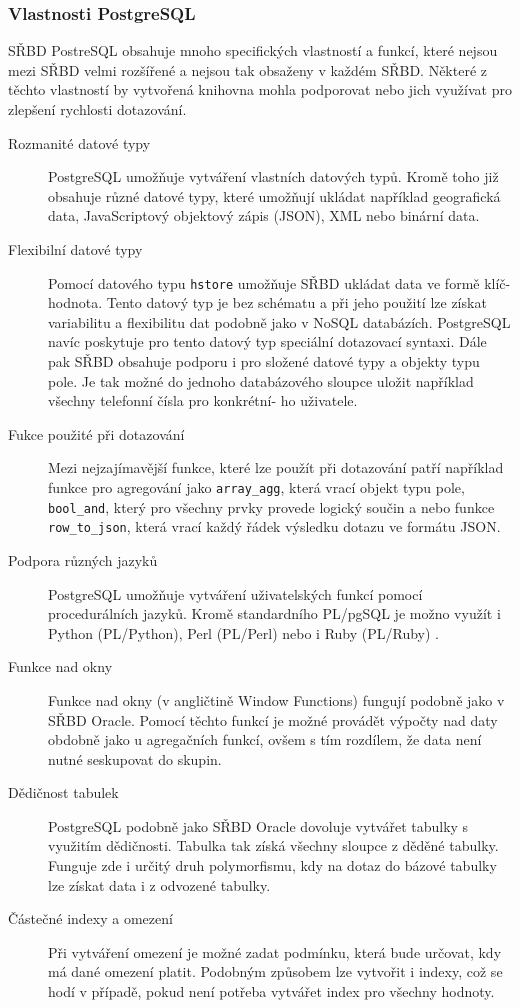 \documentclass[ing,male,java,dept456]{diploma}						%
\begin{document}
\subsubsection{Vlastnosti PostgreSQL}
\label{subsubsec:PostgreSQL}

SŘBD PostreSQL obsahuje mnoho specifických vlastností a funkcí, které nejsou mezi SŘBD velmi rozšířené a nejsou tak obsaženy v každém SŘBD. Některé z těchto vlastností by vytvořená knihovna mohla podporovat nebo jich využívat pro zlepšení rychlosti dotazování.

\begin{description}
  \item[Rozmanité datové typy] PostgreSQL umožňuje vytváření vlastních datových typů. Kromě toho již obsahuje různé datové typy, které umožňují ukládat například geografická data, JavaScriptový objektový zápis (JSON), XML nebo binární data. 
  \item[Flexibilní datové typy] Pomocí datového typu \lstinline[style=inlinepython]|hstore| umožňuje SŘBD ukládat data ve formě klíč-hodnota. Tento datový typ je bez schématu a při jeho použití lze získat variabilitu a flexibilitu dat podobně jako v NoSQL databázích. PostgreSQL navíc poskytuje pro tento datový typ speciální dotazovací syntaxi. Dále pak SŘBD obsahuje podporu i pro složené datové typy a objekty typu pole. Je tak možné do jednoho databázového sloupce uložit například všechny telefonní čísla pro konkrétní- ho uživatele. 
  \item[Fukce použité při dotazování] Mezi nejzajímavější funkce, které lze použít při dotazování patří například funkce pro agregování jako \lstinline[style=inlinepython]|array_agg|, která vrací objekt typu pole, \lstinline[style=inlinepython]|bool_and|, který pro všechny prvky provede logický součin a nebo funkce \lstinline[style=inlinepython]|row_to_json|, která vrací každý řádek výsledku dotazu ve formátu JSON.
  \item[Podpora různých jazyků] PostgreSQL umožňuje vytváření uživatelských funkcí pomocí procedurálních jazyků. Kromě standardního PL/pgSQL je možno využít i Python (PL/Python), Perl (PL/Perl) nebo i Ruby (PL/Ruby) \cite{pllanguages}. 
  \item[Funkce nad okny] Funkce nad okny (v angličtině Window Functions) fungují podobně jako v SŘBD Oracle. Pomocí těchto funkcí je možné provádět výpočty nad daty obdobně jako u agregačních funkcí, ovšem s tím rozdílem, že data není nutné seskupovat do skupin.
  \item[Dědičnost tabulek] PostgreSQL podobně jako SŘBD Oracle dovoluje vytvářet tabulky s využitím dědičnosti. Tabulka tak získá všechny sloupce z děděné tabulky. Funguje zde i určitý druh polymorfismu, kdy na dotaz do bázové tabulky lze získat data i z odvozené tabulky.
  \item[Částečné indexy a omezení] Při vytváření omezení je možné zadat podmínku, která bude určovat, kdy má dané omezení platit. Podobným způsobem lze vytvořit i indexy, což se hodí v případě, pokud není potřeba vytvářet index pro všechny hodnoty.
\end{description}
\end{document}
